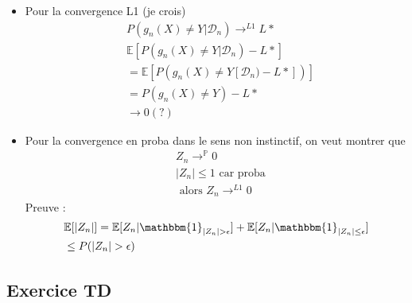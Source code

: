\documentclass{article}
\theoremstyle{plain}%
\theoremstyle{definition}
\theoremstyle{remark}
\begin{document}
\begin{itemize}
    \item Pour la convergence L1 (je crois)
    \begin{align*}
        &P(g_n(X) \neq Y | \mathcal{D}_n) \to ^{L1} L* \\
        &\mathbb{E}[ P(g_n (X) \neq  Y | \mathcal{D} _n) - L*] \\
        &= \mathbb{E} [ P(g_n(X) \neq Y [ \mathcal{D}_n ) - L*])] \\
        &= P(g_n(X) \neq Y ) - L* \\
        & \to 0 (?)
    \end{align*}
    \item Pour la convergence en proba dans le sens non instinctif, on veut montrer que
    \begin{align*}
        &Z_n \to ^{\mathbb{P}} 0 \\
        &\left| Z_n \right|  \leq 1 \text{ car proba} \\
        &\text{ alors } Z_n \to ^{L1} 0
    \end{align*}
    Preuve : \begin{align*}
        &\mathbb{E} [ \left| Z_n \right| ] = \mathbb{E} [ Z_n  | \mathbbm{1}_{\left| Z_n \right| > \epsilon  }] + \mathbb{E} [ Z_n | \mathbbm{1}_{\left| Z_n \right| \leq \epsilon }] \\
        &\leq P(\left| Z_n \right| > \epsilon )
    \end{align*}
\end{itemize}


\subsection{Exercice TD}
\end{document}
